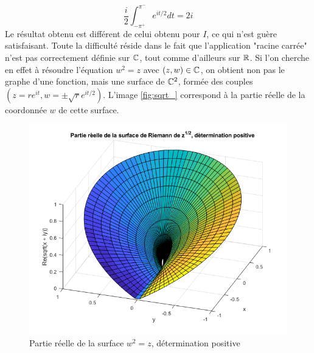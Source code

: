 \[
\frac{i}{2} \int_{-\pi^+}^{\pi^-} e^{it/2} dt = 2i
\]
Le résultat obtenu est différent de celui obtenu pour $I$, ce qui n'est guère satisfaisant. Toute la difficulté réside dans le fait que l'application "racine carrée" n'est pas correctement définie sur $\mathbb{C}$, tout comme d'ailleurs sur $\mathbb R$. Si l'on cherche en effet à résoudre l'équation $w^2 = z$ avec $(z,w)\in \mathbb{C}$, on obtient non pas le graphe d'une fonction, mais une surface de $\mathbb{C}^2$, formée des couples $(z=r e^{it},w=\pm \sqrt{r} e^{it/2})$. L'image \ref{fig:sqrt_} correspond à la partie réelle de la coordonnée $w$ de cette surface.


\begin{figure}[hbt]
\begin{center}\includegraphics[scale=0.46]{images/Surf_Riema_sqrt_Re_positive.PNG}
\end{center}
\caption{Partie réelle de la surface $w^2=z$, détermination positive}\label{fig:sqrt_positive}
\end{figure}

